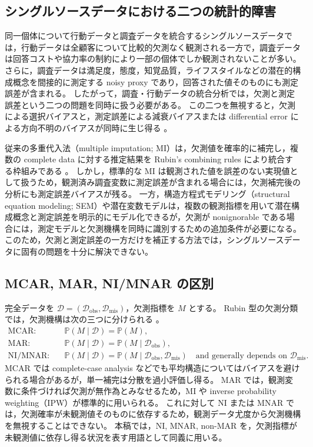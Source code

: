 \documentclass[dvipdfmx,autodetect-engine]{jsarticle}
\newcommand{\Prb}{\mathbb{P}}
\newcommand{\1}{\mathbf{1}}
\begin{document}
\subsection{シングルソースデータにおける二つの統計的障害}

同一個体について行動データと調査データを統合するシングルソースデータでは，行動データは全顧客について比較的欠測なく観測される一方で，調査データは回答コストや協力率の制約により一部の個体でしか観測されないことが多い。
さらに，調査データは満足度，態度，知覚品質，ライフスタイルなどの潜在的構成概念を間接的に測定する noisy proxy であり，回答された値そのものにも測定誤差が含まれる。
したがって，調査・行動データの統合分析では，欠測と測定誤差という二つの問題を同時に扱う必要がある。
この二つを無視すると，欠測による選択バイアスと，測定誤差による減衰バイアスまたは differential error による方向不明のバイアスが同時に生じ得る \cite{Heckman1979,ImaiYamamoto2010}。

従来の多重代入法（multiple imputation; MI）は，欠測値を確率的に補完し，複数の complete data に対する推定結果を Rubin's combining rules により統合する枠組みである \cite{Rubin1987}。
しかし，標準的な MI は観測された値を誤差のない実現値として扱うため，観測済み調査変数に測定誤差が含まれる場合には，欠測補完後の分析にも測定誤差バイアスが残る。
一方，構造方程式モデリング（structural equation modeling; SEM）や潜在変数モデルは，複数の観測指標を用いて潜在構成概念と測定誤差を明示的にモデル化できるが，欠測が nonignorable である場合には，測定モデルと欠測機構を同時に識別するための追加条件が必要になる。
このため，欠測と測定誤差の一方だけを補正する方法では，シングルソースデータに固有の問題を十分に解決できない。

\subsection{MCAR, MAR, NI/MNAR の区別}

完全データを $\mathcal{D}=(\mathcal{D}_{\mathrm{obs}},\mathcal{D}_{\mathrm{mis}})$，欠測指標を $M$ とする。
Rubin 型の欠測分類では，欠測機構は次の三つに分けられる \cite{Rubin1976,LittleRubin2002}。
\begin{align}
  \text{MCAR:}\quad&
  \Prb(M\mid \mathcal{D})=\Prb(M),
  \label{eq:mcar-def}\\
  \text{MAR:}\quad&
  \Prb(M\mid \mathcal{D})=\Prb(M\mid \mathcal{D}_{\mathrm{obs}}),
  \label{eq:mar-def}\\
  \text{NI/MNAR:}\quad&
  \Prb(M\mid \mathcal{D})=\Prb(M\mid \mathcal{D}_{\mathrm{obs}},\mathcal{D}_{\mathrm{mis}})
  \quad\text{and generally depends on }\mathcal{D}_{\mathrm{mis}}.
  \label{eq:ni-def}
\end{align}
MCAR では complete-case analysis などでも平均構造についてはバイアスを避けられる場合があるが，単一補完は分散を過小評価し得る。
MAR では，観測変数に条件づければ欠測が無作為とみなせるため，MI や inverse probability weighting（IPW）が標準的に用いられる。
これに対して NI または MNAR では，欠測確率が未観測値そのものに依存するため，観測データ尤度から欠測機構を無視することはできない。
本稿では，NI, MNAR, non-MAR を，欠測指標が未観測値に依存し得る状況を表す用語として同義に用いる。
\end{document}
